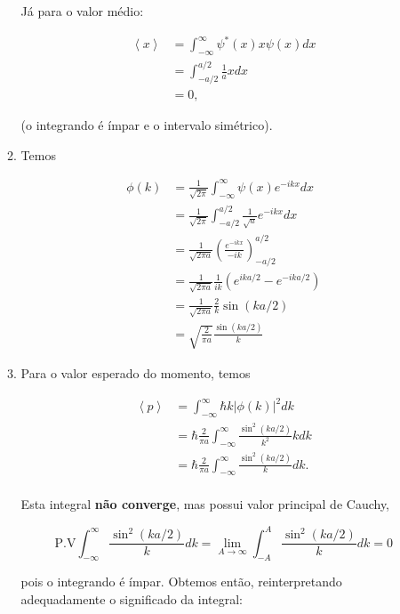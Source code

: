 \documentclass[a4paper, 12pt, notitlepage]{article}
\begin{document}
\begin{enumerate}
\begin{enumerate}
    Já para o valor médio:
  
    \begin{align*}
    \left\langle x \right\rangle &= \int_{-\infty}^{\infty} \psi^{\ast}(x) x \psi(x) dx \\
    &= \int_{-a/2}^{a/2} \frac{1}{a} x dx \\
    &= 0,
    \end{align*}
  
    \noindent (o integrando é ímpar e o intervalo simétrico).
    
    \item Temos
    
    \begin{align*}
    \phi(k) &= \frac{1}{\sqrt{2\pi}}\int_{-\infty}^{\infty} \psi(x) e^{-ikx} dx \\
    &= \frac{1}{\sqrt{2\pi}} \int_{-a/2}^{a/2} \frac{1}{\sqrt{a}} e^{-ikx} dx \\
    &= \frac{1}{\sqrt{2\pi a}} \left(\frac{e^{-ikx}}{-ik}\right)_{-a/2}^{a/2} \\
    &= \frac{1}{\sqrt{2\pi a}} \frac{1}{ik} \left(e^{ika/2} - e^{-ika/2}\right) \\
    &= \frac{1}{\sqrt{2\pi a}} \frac{2}{k} \sin(ka/2) \\
    &= \sqrt{\frac{2}{\pi a}} \frac{\sin(ka/2)}{k}
    \end{align*}
    
    \item Para o valor esperado do momento, temos
    
    \begin{align*}
    \left\langle p \right\rangle &= \int_{-\infty}^{\infty} \hbar k |\phi(k)|^2 dk \\
    &= \hbar \frac{2}{\pi a} \int_{-\infty}^{\infty} \frac{\sin^2(ka/2)}{k^2} k dk \\
    &= \hbar \frac{2}{\pi a} \int_{-\infty}^{\infty} \frac{\sin^2(ka/2)}{k} dk. \\
    \end{align*}
    
    Esta integral \textbf{não converge}, mas possui valor principal de Cauchy,
    
    \begin{equation*} \text{P.V} \int_{-\infty}^{\infty} \frac{\sin^2(ka/2)}{k} dk = \lim_{A \to \infty} \int_{-A}^{A} \frac{\sin^2(ka/2)}{k} dk = 0 \end{equation*}
    
    \noindent pois o integrando é ímpar. Obtemos então, reinterpretando adequadamente o significado da integral:
    

\end{enumerate}
\end{enumerate}
\end{document}
